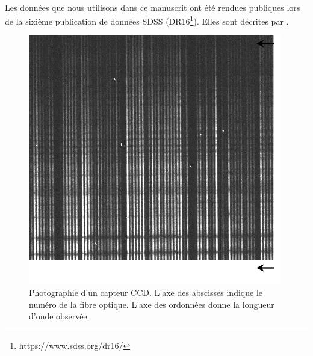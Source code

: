 \paragraph{}
Les données que nous utilisons dans ce manuscrit ont été rendues publiques lors de la sixième publication de données SDSS (DR16\footnote{https://www.sdss.org/dr16/}). Elles sont décrites par \textcite{Ahumada2019}.
\begin{figure}[b]
  \centering
  \includegraphics[scale=0.8]{photo_ccd.pdf}
  \caption{Photographie d'un capteur CCD. L'axe des abscisses indique le numéro de la fibre optique. L'axe des ordonnées donne la longueur d'onde observée.}
  \label{fig:photo_ccd}
\end{figure}

